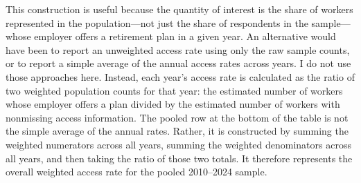 \documentclass[11pt]{article}
\begin{document}
This construction is useful because the quantity of interest is the share of workers represented in the population---not just the share of respondents in the sample---whose employer offers a retirement plan in a given year. An alternative would have been to report an unweighted access rate using only the raw sample counts, or to report a simple average of the annual access rates across years. I do not use those approaches here. Instead, each year's access rate is calculated as the ratio of two weighted population counts for that year: the estimated number of workers whose employer offers a plan divided by the estimated number of workers with nonmissing access information. The pooled row at the bottom of the table is not the simple average of the annual rates. Rather, it is constructed by summing the weighted numerators across all years, summing the weighted denominators across all years, and then taking the ratio of those two totals. It therefore represents the overall weighted access rate for the pooled 2010--2024 sample.
\end{document}
